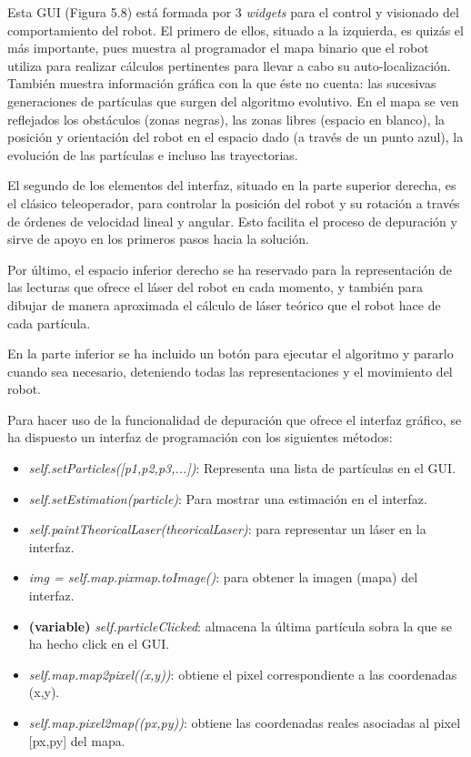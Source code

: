 Esta GUI (Figura 5.8) está formada por 3 \textit{widgets} para el control y visionado del comportamiento del robot. El primero de ellos, situado a la izquierda, es quizás el más importante, pues muestra al programador el mapa binario que el robot utiliza para realizar cálculos pertinentes para llevar a cabo su auto-localización. También muestra información gráfica con la que éste no cuenta: las sucesivas generaciones de partículas que surgen del algoritmo evolutivo. En el mapa se ven reflejados los obstáculos (zonas negras), las zonas libres (espacio en blanco), la posición y orientación del robot en el espacio dado (a través de un punto azul), la evolución de las partículas e incluso las trayectorias.
 
El segundo de los elementos del interfaz, situado en la parte superior derecha, es el clásico teleoperador, para controlar la posición del robot y su rotación a través de órdenes de velocidad lineal y angular. Esto facilita el proceso de depuración y sirve de apoyo en los primeros pasos hacia la solución.

Por último, el espacio inferior derecho se ha reservado para la representación de las lecturas que ofrece el láser del robot en cada momento, y también para dibujar de manera aproximada el cálculo de láser teórico que el robot hace de cada partícula.

En la parte inferior se ha incluido un botón para ejecutar el algoritmo y pararlo cuando sea necesario, deteniendo todas las representaciones y el movimiento del robot. 

Para hacer uso de la funcionalidad de depuración que ofrece el interfaz gráfico, se ha dispuesto un interfaz de programación con los siguientes métodos:

\begin{itemize}
	\item \textit{self.setParticles([p1,p2,p3,...])}: Representa una lista de partículas en el GUI.
	\item \textit{self.setEstimation(particle)}: Para mostrar una estimación en el interfaz.
	\item \textit{self.paintTheoricalLaser(theoricalLaser)}: para representar un láser en la interfaz.
	\item \textit{img = self.map.pixmap.toImage()}: para obtener la imagen (mapa) del interfaz.
	\item \textbf{(variable)} \textit{self.particleClicked}: almacena la última partícula sobra la que se ha hecho click en el GUI. 
	\item \textit{self.map.map2pixel((x,y))}: obtiene el pixel correspondiente a las coordenadas (x,y).
	\item \textit{self.map.pixel2map((px,py))}: obtiene las coordenadas reales asociadas al pixel [px,py] del mapa.
\end{itemize}

